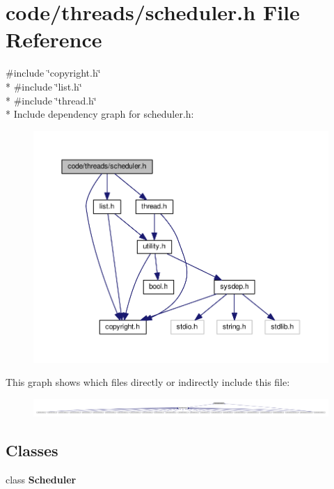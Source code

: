 \section{code/threads/scheduler.h File Reference}
\label{scheduler_8h}
{\ttfamily \#include \char`\"{}copyright.\+h\char`\"{}}\\*
{\ttfamily \#include \char`\"{}list.\+h\char`\"{}}\\*
{\ttfamily \#include \char`\"{}thread.\+h\char`\"{}}\\*
Include dependency graph for scheduler.\+h\+:
\nopagebreak
\begin{figure}[H]
\begin{center}
\leavevmode
\includegraphics[width=350pt]{scheduler_8h__incl}
\end{center}
\end{figure}
This graph shows which files directly or indirectly include this file\+:
\nopagebreak
\begin{figure}[H]
\begin{center}
\leavevmode
\includegraphics[width=350pt]{scheduler_8h__dep__incl}
\end{center}
\end{figure}
\subsection*{Classes}
\begin{DoxyCompactItemize}
\item 
class {\bf Scheduler}
\end{DoxyCompactItemize}
